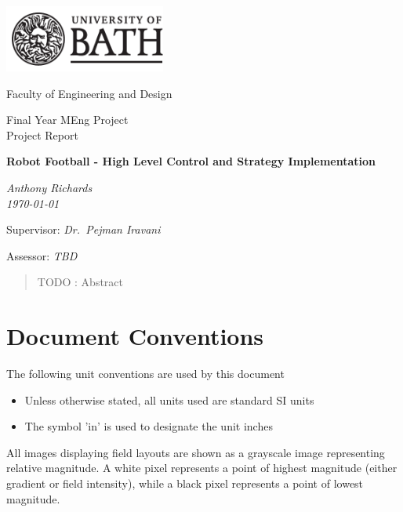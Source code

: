 \begin{titlepage}
  \setlength{\parindent}{0cm}

  \includegraphics[width=200px]{Images/uob-logo-black-transparent}

  \Large
  Faculty of Engineering and Design

  \vspace{80pt}

  \LARGE
  Final Year MEng Project \\
  Project Report

  \vspace{80pt}
  \textbf{Robot Football - High Level Control and Strategy Implementation}

  \vspace{10pt}
  \emph{Anthony Richards} \\
  \emph{\today}

  \vspace{80pt}
  Supervisor: \emph{Dr.~Pejman Iravani}

  \vspace{10pt}
  Assessor: \emph{TBD}
\end{titlepage}


\begin{abstract}
TODO : Abstract
\end{abstract}

\tableofcontents

\section*{Document Conventions}
The following unit conventions are used by this document

\begin{itemize}
  \item Unless otherwise stated, all units used are standard SI units
  \item The symbol 'in' is used to designate the unit inches
\end{itemize}

All images displaying field layouts are shown as a grayscale image representing
relative magnitude.  A white pixel represents a point of highest magnitude
(either gradient or field intensity), while a black pixel represents a point of
lowest magnitude.

